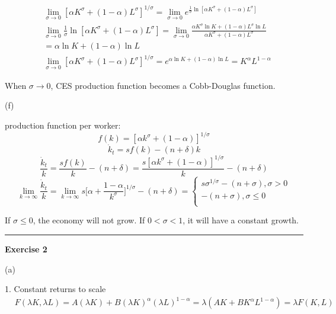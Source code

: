 \documentclass[letterpaper, 11pt]{article}
\newcommand{\1}{\mathds{1}}	%
\theoremstyle{definition}
\begin{document}
\begin{align*}
   & \lim_{\sigma \to 0} \left[ \alpha K^{\sigma}  + (1-\alpha)L ^{\sigma}\right]^{1/\sigma} = \lim_{\sigma \to 0} e^{\frac{1}{\sigma}\ln[\alpha K^\sigma + (1-\alpha)L^\sigma]}                          \\
   & \lim_{\sigma \to 0} \frac{1}{\sigma}\ln[\alpha K^\sigma + (1-\alpha)L^\sigma] = \lim_{\sigma \to 0} \frac{\alpha K^{\sigma}\ln K + (1-\alpha)L^{\sigma} \ln L}{\alpha K^\sigma + (1-\alpha)L^\sigma} \\
   & = \alpha \ln K + (1-\alpha) \ln L                                                                                                                                                                    \\
   & \lim_{\sigma \to 0} \left[ \alpha K^{\sigma}  + (1-\alpha)L ^{\sigma}\right]^{1/\sigma} = e ^{\alpha \ln K + (1-\alpha) \ln L} = K^{\alpha}L^{1-\alpha}
\end{align*}

When $\sigma \to 0$, CES production function becomes a Cobb-Douglas function.

(f)

production function per worker: \[
  f(k) = [\alpha k^{\sigma} + (1-\alpha)]^{1/\sigma}
\]
\[
  \dot{k}_t = sf(k) - (n + \delta) k
\]
\[
  \frac{\dot{k}_t}{k} = \frac{sf(k)}{k} - (n+\delta) = \frac{s[\alpha k^{\sigma} + (1-\alpha)]^{1/\sigma}}{k} - (n + \delta)
\]
\[
  \lim_{k \to \infty} \frac{\dot{k}_t}{k} = \lim_{k \to \infty}  s\Big[ \alpha + \frac{1-\alpha}{k^\sigma} \Big]^{1/\sigma} - (n+\delta) = \left\{\begin{array}{l}
    s\sigma^{1/\sigma} - (n+\sigma), \sigma > 0 \\
    -(n+\sigma), \sigma \leq 0                  \\
  \end{array}\right.
\]

If $\sigma \leq 0$, the economy will not grow. If $0<\sigma<1$, it will have a constant growth.

\bigskip
\hrule
\bigskip

\textbf{Exercise 2}

(a)


1. Constant returns to scale \begin{align*}
   & F(\lambda K, \lambda L) = A(\lambda K) + B (\lambda K)^{\alpha}(\lambda L)^{1-\alpha} = \lambda (AK + B K^{\alpha}L^{1-\alpha}) = \lambda F(K,L)
\end{align*}
\end{document}
